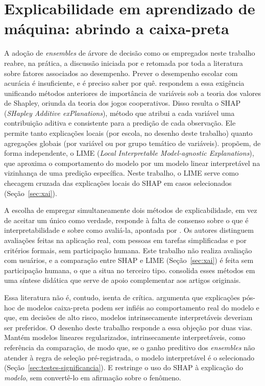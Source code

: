 \section{Explicabilidade em aprendizado de máquina: abrindo a caixa-preta}
\label{sec:xai-revisao}

A adoção de \textit{ensembles} de árvore de decisão como os empregados
neste trabalho reabre, na prática, a discussão iniciada por
 e retomada por toda a literatura sobre
fatores associados ao desempenho. Prever o desempenho escolar com acurácia
é insuficiente, e é preciso saber por quê. 
respondem a essa exigência unificando métodos anteriores de importância de
variáveis sob a teoria dos valores de Shapley, oriunda da teoria dos jogos
cooperativos. Disso resulta o SHAP (\textit{SHapley Additive
exPlanations}), método que atribui a cada variável uma contribuição aditiva
e consistente para a predição de cada observação. Ele permite tanto
explicações locais (por escola, no desenho deste trabalho) quanto
agregações globais (por variável ou por grupo temático de variáveis).
 propõem, de forma independente, o LIME
(\textit{Local Interpretable Model-agnostic Explanations}), que aproxima o
comportamento do modelo por um modelo linear interpretável na vizinhança de
uma predição específica. Neste trabalho, o LIME serve como checagem
cruzada das explicações locais do SHAP em casos selecionados
(Seção~\ref{sec:xai}).

A escolha de empregar simultaneamente dois métodos de explicabilidade, em
vez de aceitar um único como verdade, responde à falta de consenso sobre o
que é interpretabilidade e sobre como avaliá-la, apontada por
. Os autores distinguem avaliações
feitas na aplicação real, com pessoas em tarefas simplificadas e por
critérios formais, sem participação humana. Este trabalho não realiza
avaliação com usuários, e a comparação entre SHAP e LIME
(Seção~\ref{sec:xai}) é feita sem participação humana, o que a situa no
terceiro tipo.  consolida
esses métodos em uma síntese didática que serve de apoio complementar aos
artigos originais.

Essa literatura não é, contudo, isenta de crítica.
 argumenta que explicações pós-hoc de modelos
caixa-preta podem ser infiéis ao comportamento real do modelo e que, em
decisões de alto risco, modelos intrinsecamente interpretáveis deveriam
ser preferidos. O desenho deste trabalho responde a essa objeção por duas
vias. Mantém modelos lineares regularizados, intrinsecamente
interpretáveis, como referência da comparação, de modo que, se o ganho
preditivo dos \textit{ensembles} não atender à regra de seleção
pré-registrada, o modelo interpretável é o selecionado
(Seção~\ref{sec:testes-significancia}). E restringe o uso do SHAP à
explicação do \emph{modelo}, sem convertê-lo em afirmação sobre o
fenômeno.

